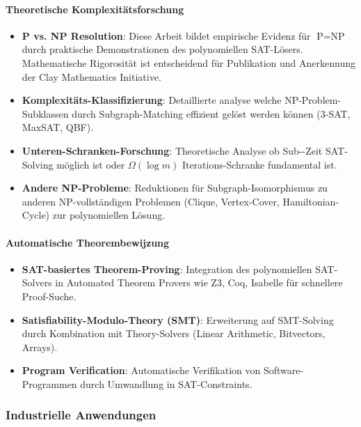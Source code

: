 ﻿\documentclass[a4paper,12pt]{article}
\theoremstyle{definition}
\begin{document}
\paragraph{Theoretische Komplexitätsforschung}

\begin{itemize}
	\item \textbf{P vs. NP Resolution}: Diese Arbeit bildet empirische Evidenz für $\text{P} = \text{NP}$ durch praktische Demonstrationen des polynomiellen SAT-Lösers. Mathematische Rigorosität ist entscheidend für Publikation und Anerkennung der Clay Mathematics Initiative.
	
	\item \textbf{Komplexitäts-Klassifizierung}: Detaillierte analyse welche NP-Problem-Subklassen durch Subgraph-Matching effizient gelöst werden können (3-SAT, MaxSAT, QBF).
	
	\item \textbf{Unteren-Schranken-Forschung}: Theoretische Analyse ob Sub-\cite{Epp26}-Zeit SAT-Solving möglich ist oder $\Omega(\log m)$ Iterations-Schranke fundamental ist.
	
	\item \textbf{Andere NP-Probleme}: Reduktionen für Subgraph-Isomorphismus zu anderen NP-vollständigen Problemen (Clique, Vertex-Cover, Hamiltonian-Cycle) zur polynomiellen Lösung.
\end{itemize}

\paragraph{Automatische Theorembewijzung}

\begin{itemize}
	\item \textbf{SAT-basiertes Theorem-Proving}: Integration des polynomiellen SAT-Solvers in Automated Theorem Provers wie Z3, Coq, Isabelle für schnellere Proof-Suche.
	
	\item \textbf{Satisfiability-Modulo-Theory (SMT)}: Erweiterung auf SMT-Solving durch Kombination mit Theory-Solvers (Linear Arithmetic, Bitvectors, Arrays).
	
	\item \textbf{Program Verification}: Automatische Verifikation von Software-Programmen durch Umwandlung in SAT-Constraints.
\end{itemize}

\subsubsection{Industrielle Anwendungen}
\end{document}
